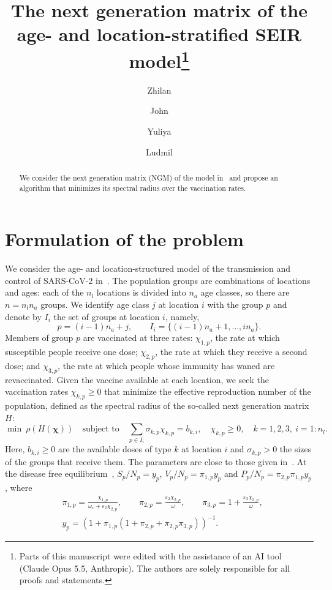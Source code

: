 \documentclass[11pt]{article}
\title{The next generation matrix of the age- and location-stratified SEIR model\thanks{Parts of this manuscript were edited with the assistance of an AI tool (Claude Opus 5.5, Anthropic). The authors are solely responsible for all proofs and statements.}}
\author{Zhilan \and John \and Yuliya \and Ludmil}
\date{}
\theoremstyle{plain}
\theoremstyle{remark}
\numberwithin{equation}{section}
\begin{document}
\maketitle

\begin{abstract}
We consider the next generation matrix (NGM) of the model in~\cite{2026Feng_Day_Glasser}
and propose an algorithm that minimizes its spectral radius over the vaccination rates.
\end{abstract}

\section{Formulation of the problem}\label{sec-formulation}
We consider the age- and location-structured model of the transmission and control
of SARS-CoV-2 in~\cite{2026Feng_Day_Glasser}.
The population groups are combinations of locations and
ages: each of the $n_l$ locations is divided into $n_a$ age classes, so there are
$n=n_ln_a$ groups. We identify age class $j$ at location $i$ with the group
$p$ and denote by $I_i$ the set of groups at location $i$, namely,
\begin{equation}\label{group-index}
p=(i-1)n_a+j,\qquad I_i=\{(i-1)n_a+1,\ldots,in_a\}.
\end{equation}
Members of group $p$ are vaccinated at three rates: $\chi_{1,p}$, the rate at which
susceptible people receive one dose; $\chi_{2,p}$, the rate at which they receive a
second dose; and $\chi_{3,p}$, the rate at which people whose immunity has waned are
revaccinated. Given the vaccine available at each location, we seek the vaccination
rates $\chi_{k,p}\ge 0$ that minimize the effective reproduction number of the
population, defined as the spectral radius of the so-called next generation matrix
$H$:
\begin{equation}\label{problem}
\min\ \rho\left(H(\bm\chi)\right)\quad\mbox{subject to}\quad
\sum_{p\in I_i}\sigma_{k,p}\chi_{k,p}=b_{k,i},\quad \chi_{k,p}\ge 0,\quad k=1,2,3,\ i=1:n_l.
\end{equation}
Here, $b_{k,i}\ge 0$ are the available doses of type $k$ at location $i$ and
$\sigma_{k,p}>0$ the sizes of the groups that receive them. The parameters are close
to those given in~\cite{2026Feng_Day_Glasser}. At the disease free
equilibrium~\cite[Appendix~A]{2026Feng_Day_Glasser},
$S_p/N_p=y_p$, $V_p/N_p=\pi_{1,p}y_p$ and
$P_p/N_p=\pi_{2,p}\pi_{1,p}y_p$, where
\begin{equation}\label{pis}
\begin{aligned}
&\pi_{1,p}=\frac{\chi_{1,p}}{\omega_v+\varepsilon_2\chi_{2,p}},\qquad
\pi_{2,p}=\frac{\varepsilon_2\chi_{2,p}}{\omega},\qquad
\pi_{3,p}=1+\frac{\varepsilon_3\chi_{3,p}}{\omega},\\
&y_p=\left(1+\pi_{1,p}\left(1+\pi_{2,p}+\pi_{2,p}\pi_{3,p}\right)\right)^{-1}.
\end{aligned}
\end{equation}
\end{document}
